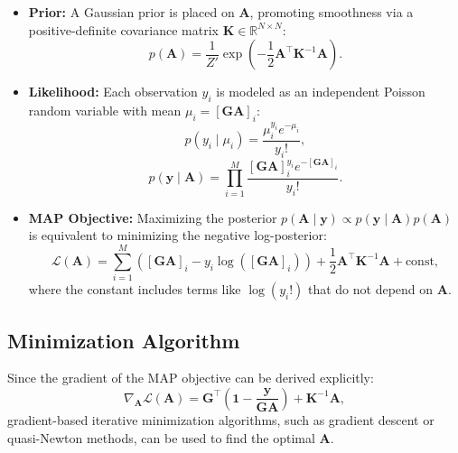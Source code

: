 \documentclass[12pt]{article}
\begin{document}
\begin{itemize}
    \item \textbf{Prior:} A Gaussian prior is placed on \( \mathbf{A} \), promoting smoothness via a positive-definite covariance matrix \( \mathbf{K} \in \mathbb{R}^{N \times N} \):
    \begin{equation}
        p(\mathbf{A}) = \frac{1}{Z'} \exp\left( -\frac{1}{2} \mathbf{A}^\top \mathbf{K}^{-1} \mathbf{A} \right).
    \end{equation}

    \item \textbf{Likelihood:} Each observation \( y_i \) is modeled as an independent Poisson random variable with mean \( \mu_i = [\mathbf{G} \mathbf{A}]_i \):
    \begin{equation}
        p(y_i \mid \mu_i) = \frac{\mu_i^{y_i} e^{-\mu_i}}{y_i!},
    \end{equation}
    \begin{equation}
        p(\mathbf{y} \mid \mathbf{A}) = \prod_{i=1}^M \frac{[\mathbf{G} \mathbf{A}]_i^{y_i} e^{-[\mathbf{G} \mathbf{A}]_i}}{y_i!}.
    \end{equation}

    \item \textbf{MAP Objective:} Maximizing the posterior \( p(\mathbf{A} \mid \mathbf{y}) \propto p(\mathbf{y} \mid \mathbf{A}) p(\mathbf{A}) \) is equivalent to minimizing the negative log-posterior:
    \begin{equation}
        \mathcal{L}(\mathbf{A}) = \sum_{i=1}^M \left( [\mathbf{G} \mathbf{A}]_i - y_i \log([\mathbf{G} \mathbf{A}]_i) \right) + \frac{1}{2} \mathbf{A}^\top \mathbf{K}^{-1} \mathbf{A} + \text{const},
    \end{equation}
    where the constant includes terms like \( \log(y_i!) \) that do not depend on \( \mathbf{A} \).
\end{itemize}

\subsection{Minimization Algorithm}
Since the gradient of the MAP objective can be derived explicitly:
\begin{equation}
    \nabla_{\mathbf{A}} \mathcal{L}(\mathbf{A}) = 
    \mathbf{G}^\top \left( \mathbf{1} - \frac{\mathbf{y}}{\mathbf{G} \mathbf{A}} \right) + \mathbf{K}^{-1} \mathbf{A},
\end{equation}
gradient-based iterative minimization algorithms, such as gradient descent or quasi-Newton methods, can be used to find the optimal \( \mathbf{A} \).
\end{document}
